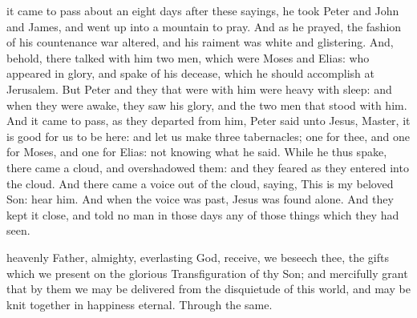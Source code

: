  it came to pass about an eight days after these sayings, he took Peter and John and James, and went up into a mountain to pray. And as he prayed, the fashion of his countenance war altered, and his raiment was white and glistering. And, behold, there talked with him two men, which were Moses and Elias: who appeared in glory, and spake of his decease, which he should accomplish at Jerusalem. But Peter and they that were with him were heavy with sleep: and when they were awake, they saw his glory, and the two men that stood with him. And it came to pass, as they departed from him, Peter said unto Jesus, Master, it is good for us to be here: and let us make three tabernacles; one for thee, and one for Moses, and one for Elias: not knowing what he said. While he thus spake, there came a cloud, and overshadowed them: and they feared as they entered into the cloud. And there came a voice out of the cloud, saying, This is my beloved Son: hear him. And when the voice was past, Jesus was found alone. And they kept it close, and told no man in those days any of those things which they had seen.

\secret
{} heavenly Father, almighty, everlasting God, receive, we beseech thee, the gifts which we present on the glorious Transfiguration of thy Son; and mercifully grant that by them we may be delivered from the disquietude of this world, and may be knit together in happiness eternal. Through the same.

